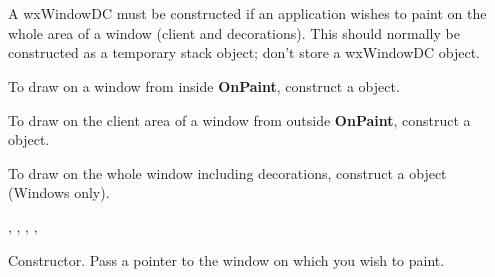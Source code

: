 \section{}\label{wxwindowdc}

A wxWindowDC must be constructed if an application wishes to paint on the
whole area of a window (client and decorations).
This should normally be constructed as a temporary stack object; don't store
a wxWindowDC object.

To draw on a window from inside {\bf OnPaint}, construct a  object.

To draw on the client area of a window from outside {\bf OnPaint}, construct a  object.

To draw on the whole window including decorations, construct a  object
(Windows only).




, , ,\rtfsp
{}, 




Constructor. Pass a pointer to the window on which you wish to paint.



